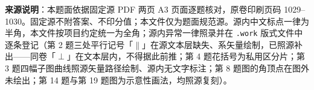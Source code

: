 


\begin{gktip}
\textbf{来源说明}：本题面依据固定源 PDF 两页 A3 页面逐题核对，原卷印刷页码 1029–1030。固定源不附答案、不印分值；本文件仅为题面规范源。源内中文标点一律为半角，本文件按项目约定统一为全角；源内异常一律照录并在 \texttt{.work} 版式文件中逐条登记（第 2 题三处平行记号「$\parallel$」在源文本层缺失、系矢量绘制，已照源补出——同卷「$\perp$」在文本层内，不得据此前推；第 4 题花括号为私用区分片；第 3 题四幅子图曲线照源矢量路径绘制、源内无文字标注；第 8 题图的角顶点在图外未绘出；第 14 题与第 19 题图为示意性画法，均照源复刻）。
\end{gktip}


